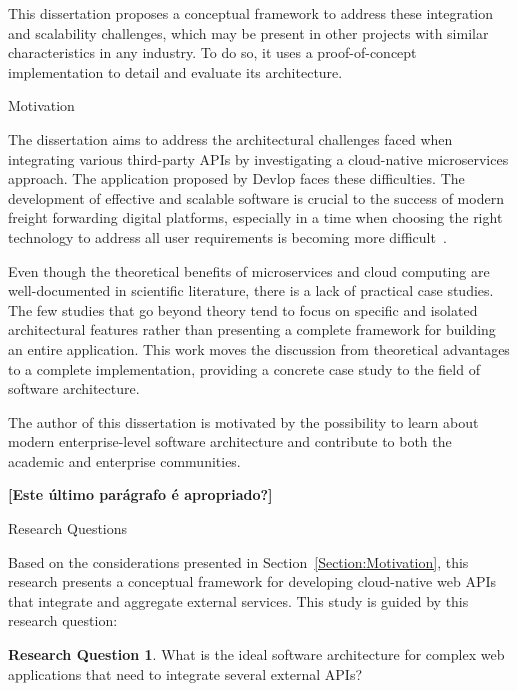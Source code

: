 \documentclass[12pt,reqno, oneside]{amsbook}
\makeatletter
\def\section{\@startsection{section}{1}%
      \z@{.5\linespacing\@plus.7\linespacing}{.25\linespacing}%
      {\normalfont\bfseries\flushleft}}
\theoremstyle{definition}
\theoremstyle{definition}
\newtheorem{research_question}{Research Question}
\numberwithin{section}{chapter}
\numberwithin{table}{chapter}
\numberwithin{figure}{chapter}
\makeatother
\begin{document}
This dissertation proposes a conceptual framework to address these integration and scalability challenges, which may be present in other projects with similar characteristics in any industry. To do so, it uses a proof-of-concept implementation to detail and evaluate its architecture.


\section{Motivation}
\label{Section:Motivation}

The dissertation aims to address the architectural challenges faced when integrating various third-party \acp{API} by investigating a cloud-native microservices approach. The application proposed by Devlop faces these difficulties. The development of effective and scalable software is crucial to the success of modern freight forwarding digital platforms, especially in a time when choosing the right technology to address all user requirements is becoming more difficult~\cite{Mushica2024}.

Even though the theoretical benefits of microservices and cloud computing are well-documented in scientific literature, there is a lack of practical case studies. The few studies that go beyond theory tend to focus on specific and isolated architectural features rather than presenting a complete framework for building an entire application. This work moves the discussion from theoretical advantages to a complete implementation, providing a concrete case study to the field of software architecture.

The author of this dissertation is motivated by the possibility to learn about modern enterprise-level software architecture and contribute to both the academic and enterprise communities.

\textbf{[Este último parágrafo é apropriado?]}


\section{Research Questions}
\label{Section:Research_Questions}

Based on the considerations presented in Section~\ref{Section:Motivation}, this research presents a conceptual framework for developing cloud-native web \acp{API} that integrate and aggregate external services. This study is guided by this research question:
\begin{research_question}
  What is the ideal software architecture for complex web applications that need to integrate several external \acp{API}?
\end{research_question}
\end{document}
